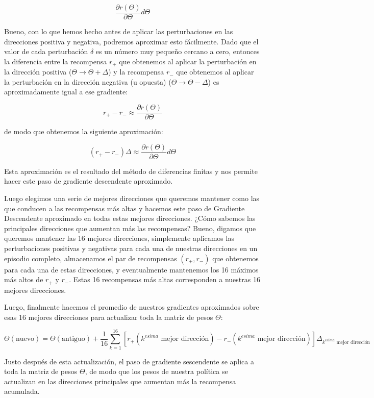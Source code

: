 \documentclass[]{book}
\begin{document}
\[\frac{\partial r(\Theta)}{\partial \Theta} d \Theta\]

Bueno, con lo que hemos hecho antes de aplicar las perturbaciones en las direcciones positiva y negativa, podremos aproximar esto fácilmente. Dado que el valor de cada perturbación \(\delta\) es un número muy pequeño cercano a cero, entonces la diferencia entre la recompensa \(r_{+}\) que obtenemos al aplicar la perturbación en la dirección positiva (\(\Theta\rightarrow\Theta + \Delta\)) y la recompensa \(r_{-}\) que obtenemos al aplicar la perturbación en la dirección negativa (u opuesta) (\(\Theta\rightarrow\Theta - \Delta\)) es aproximadamente igual a ese gradiente:

\[r_{+} - r_{-} \approx \frac{\partial r(\Theta)}{\partial \Theta}\]

de modo que obtenemos la siguiente aproximación:

\[(r_{+} - r_{-}) \Delta \approx \frac{\partial r(\Theta)}{\partial \Theta} d \Theta\]

Esta aproximación es el resultado del método de diferencias finitas y nos permite hacer este paso de gradiente descendente aproximado.

Luego elegimos una serie de mejores direcciones que queremos mantener como las que conducen a las recompensas más altas y hacemos este paso de Gradiente Descendente aproximado en todas estas mejores direcciones. ¿Cómo sabemos las principales direcciones que aumentan más las recompensas? Bueno, digamos que queremos mantener las 16 mejores direcciones, simplemente aplicamos las perturbaciones positivas y negativas para cada una de nuestras direcciones en un episodio completo, almacenamos el par de recompensas \((r_{+}, r_{-})\) que obtenemos para cada una de estas direcciones, y eventualmente mantenemos los 16 máximos más altos de \(r_{+}\) y \(r_{-}\). Estas 16 recompensas más altas corresponden a nuestras 16 mejores direcciones.

Luego, finalmente hacemos el promedio de nuestros gradientes aproximados sobre esas 16 mejores direcciones para actualizar toda la matriz de pesos \(\Theta\):

\[
\Theta(\textrm{nuevo}) = \Theta(\textrm{antiguo}) + \frac{1}{16}\sum_{k=1}^{16} [r_{+}(\textrm{$k^{esima}$ mejor dirección}) - r_{-}(\textrm{$k^{esima}$ mejor dirección})] \Delta_{\textrm{$k^{esima}$ mejor dirección}}
\]

Justo después de esta actualización, el paso de gradiente sescendente se aplica a toda la matriz de pesos \(\Theta\), de modo que los pesos de nuestra política se actualizan en las direcciones principales que aumentan más la recompensa acumulada.
\end{document}
